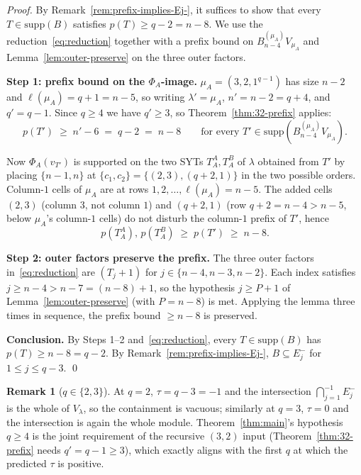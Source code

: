 \documentclass[11pt]{article}
\theoremstyle{definition}
\newtheorem{remark}[theorem]{Remark}
\newcommand{\supp}{\mathrm{supp}}
\begin{document}
\begin{proof}
By Remark~\ref{rem:prefix-implies-Ej-}, it suffices to show that
every $T \in \supp(B)$ satisfies $p(T) \ge q - 2 = n - 8$.  We use
the reduction~\eqref{eq:reduction} together with a prefix bound on
$B^{(\mu_A)}_{n-4} V_{\mu_A}$ and Lemma~\ref{lem:outer-preserve} on
the three outer factors.

\medskip\textbf{Step 1: prefix bound on the $\Phi_A$-image.}
$\mu_A = (3, 2, 1^{q-1})$ has size $n - 2$ and $\ell(\mu_A) = q + 1
= n - 5$, so writing $\lambda' = \mu_A$, $n' = n - 2 = q + 4$,
and $q' = q - 1$.  Since $q \ge 4$ we have $q' \ge 3$, so
Theorem~\ref{thm:32-prefix} applies:
\[
   p(T') \;\ge\; n' - 6 \;=\; q - 2 \;=\; n - 8
   \qquad \text{for every } T' \in \supp(B^{(\mu_A)}_{n-4} V_{\mu_A}).
\]

Now $\Phi_A(v_{T'})$ is supported on the two SYTs $T_A^A, T_A^B$ of
$\lambda$ obtained from $T'$ by placing $\{n-1, n\}$ at $\{c_1, c_2\}
= \{(2, 3), (q+2, 1)\}$ in the two possible orders.  Column-$1$ cells
of $\mu_A$ are at rows $1, 2, \ldots, \ell(\mu_A) = n - 5$.  The added
cells $(2, 3)$ (column $3$, not column $1$) and $(q+2, 1)$ (row $q+2 =
n - 4 > n - 5$, below $\mu_A$'s column-$1$ cells) do not disturb the
column-$1$ prefix of $T'$, hence
\[
   p(T_A^A),\, p(T_A^B) \;\ge\; p(T') \;\ge\; n - 8.
\]

\medskip\textbf{Step 2: outer factors preserve the prefix.}
The three outer factors in~\eqref{eq:reduction} are $(T_j{+}1)$
for $j \in \{n-4, n-3, n-2\}$.  Each index satisfies $j \ge n - 4 >
n - 7 = (n - 8) + 1$, so the hypothesis $j \ge P + 1$ of
Lemma~\ref{lem:outer-preserve} (with $P = n - 8$) is met.  Applying
the lemma three times in sequence, the prefix bound $\ge n - 8$ is
preserved.

\medskip\textbf{Conclusion.}  By Steps 1--2 and~\eqref{eq:reduction},
every $T \in \supp(B)$ has $p(T) \ge n - 8 = q - 2$.  By
Remark~\ref{rem:prefix-implies-Ej-}, $B \subseteq E_j^-$ for $1 \le
j \le q - 3$.
\qed
\end{proof}

\begin{remark}[$q \in \{2, 3\}$]\label{rem:q23-vacuous}
At $q = 2$, $\tau = q - 3 = -1$ and the intersection $\bigcap_{j=1}^{-1}
E_j^-$ is the whole of $V_\lambda$, so the containment is vacuous;
similarly at $q = 3$, $\tau = 0$ and the intersection is again the
whole module.  Theorem~\ref{thm:main}'s hypothesis $q \ge 4$ is the
joint requirement of the recursive $(3, 2)$ input (Theorem~\ref{thm:32-prefix}
needs $q' = q - 1 \ge 3$), which exactly aligns with the first $q$ at
which the predicted $\tau$ is positive.
\end{remark}
\end{document}
